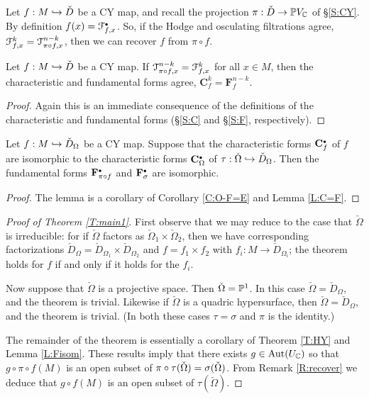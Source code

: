 \documentclass[12pt]{amsart}
\numberwithin{equation}{section}
\numberwithin{table}{section}
\numberwithin{figure}{section}
\begin{document}
\begin{remark} \label{R:recover}
Let $f : M \inj \check D$ be a CY map, and recall the projection $\pi : \check D \to \bP V_\bC$ of \S\ref{S:CY}.  By definition $f(x) = \cF^\sb_{f,x}$.  So, if the Hodge and osculating filtrations agree, $\cF^k_{f,x} = \cT^{n-k}_{\pi\circ f,x}$, then we can recover $f$ from $\pi \circ f$.
\end{remark}



\begin{lemma} \label{L:C=F}
Let $f : M \inj \check D$ be a CY map.  If $\cT^{n-k}_{\pi\circ f, x} = \cF^k_{f,x}$ for all $x \in M$, then the characteristic and fundamental forms agree, $\mathbf{C}^{k}_f = \mathbf{F}^{n-k}_f$.
\end{lemma}

\begin{proof}
Again this is an immediate consequence of the definitions of the characteristic and fundamental forms (\S\ref{S:C} and \S\ref{S:F}, respectively).
\end{proof}

\begin{lemma} \label{L:Fisom}
Let $f : M \inj \check D_\Omega$ be a CY map.  Suppose that the characteristic forms $\mathbf{C}^\sb_f$ of $f$ are isomorphic to the characteristic forms $\mathbf{C}^\sb_\Omega$ of $\tau : \check\Omega \inj \check D_\Omega$.  Then the fundamental forms $\mathbf{F}^\sb_{\pi\circ f}$ and $\mathbf{F}^\sb_\s$ are isomorphic.
\end{lemma}

\begin{proof}
The lemma is a corollary of Corollary \ref{C:O-F=E} and Lemma \ref{L:C=F}.
\end{proof}


\begin{proof}[Proof of Theorem \ref{T:main1}]
First observe that we may reduce to the case that $\check \Omega$ is irreducible: for if $\check \Omega$ factors as $\check \Omega_1 \times \check \Omega_2$, then we have corresponding factorizations $\check D_\Omega = \check D_{\Omega_1} \times \check D_{\Omega_2}$ and $f = f_1 \times f_2$ with $f_i : M \to \check D_{\Omega_i}$; the theorem holds for $f$ if and only if it holds for the $f_i$.

Now suppose that $\check\Omega$ is a projective space.  Then $\check \Omega = \bP^1$.  In this case $\check \Omega = \check D_{\Omega}$, and the theorem is trivial.  Likewise if $\check\Omega$ is a quadric hypersurface, then $\check\Omega = \check D_\Omega$, and the theorem is trivial.  (In both these cases $\tau = \sigma$ and $\pi$ is the identity.)

The remainder of the theorem is essentially a corollary of Theorem \ref{T:HY} and Lemma \ref{L:Fisom}.  These results imply that there exists $g \in \tAut(U_\bC)$ so that $g \circ \pi \circ f(M)$ is an open subset of $\pi\circ\tau(\check\Omega) = \s(\check\Omega)$.  From Remark \ref{R:recover} we deduce that $g \circ f (M)$ is an open subset of $\tau(\check\Omega)$.
\end{proof}
\end{document}
